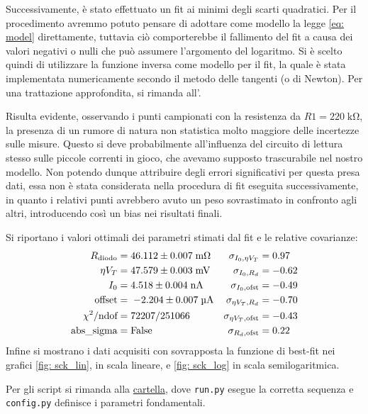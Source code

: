 \documentclass{article}[a4paper, oneside, 11pt]
\begin{document}
Successivamente, \`e stato effettuato un fit ai minimi degli scarti quadratici.
Per il procedimento avremmo potuto pensare di adottare come modello la legge
\eqref{eq: model} direttamente, tuttavia ci\`o comporterebbe il fallimento del
fit a causa dei valori negativi o nulli che pu\`o assumere l'argomento del
logaritmo. Si \`e scelto quindi di utilizzare la funzione inversa come modello
per il fit, la quale \`e stata implementata numericamente secondo il metodo
delle tangenti (o di Newton).
Per una trattazione approfondita, si rimanda all'.

Risulta evidente, osservando i punti campionati con la resistenza da
$R1 = 220 \; \si{\kohm}$, la presenza di un rumore di natura non statistica
molto maggiore delle incertezze sulle misure. 
Questo si deve probabilmente all'influenza del circuito di lettura
stesso sulle piccole correnti in gioco, che avevamo supposto trascurabile
nel nostro modello. Non potendo dunque attribuire degli errori significativi
per questa presa dati, essa non \`e stata considerata nella procedura di
fit eseguita successivamente, in quanto i relativi punti avrebbero avuto un
peso sovrastimato in confronto agli altri, introducendo cos\`i un bias
nei risultati finali.
 
Si riportano i valori ottimali dei parametri stimati dal fit e le relative
covarianze: %
\begin{align*}
	R_{\text{diodo}} &= 46.112\iffalse 18 \fi \pm 0.007\iffalse 2 \fi \; \si{\mohm} 
	&\sigma_{I_0, \eta V_T} &= 0.97  \\
	\eta V_T &= 47.579\iffalse 86 \fi \pm 0.003\iffalse 3 \fi \; \si{\mV} 	
	&\sigma_{I_0, R_d} &= -0.62 \\
	I_0 &= 4.518\iffalse 0 \fi \pm 0.004\iffalse 3 \fi \; \si{\nA}
	&\sigma_{I_0, \text{ofst}} &= -0.49 \\
	\text{offset} &=\; - 2.204\iffalse 3 \fi \pm 0.007 \iffalse 3 \fi \; \si{\uA}
	&\sigma_{\eta V_T, R_d} &= -0.70  \\ 
	\chi^2/\text{ndof} &= 72207/251066
	&\sigma_{\eta V_T, \text{ofst}} &= -0.43\\
	\text{abs\_sigma} &= \rm False
	&\sigma_{R_d, \text{ofst}} &= 0.22
\end{align*}
Infine si mostrano i dati acquisiti con sovrapposta la funzione di best-fit
nei grafici \ref{fig: sck_lin}, in scala lineare, e \ref{fig: sck_log}
in scala semilogaritmica. 

Per gli script si rimanda alla 
\href{https://github.com/LucaCiucci/relaz_seme/tree/master/Cartella_fit}
{cartella}, dove \verb+run.py+ esegue la corretta sequenza e \verb+config.py+
definisce i parametri fondamentali.
\end{document}
